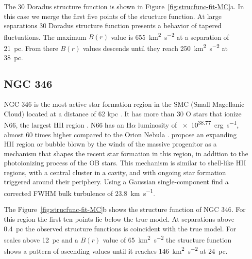 \documentclass[fleqn,usenatbib, useAMS, a4paper]{mnras}
\newcommand\pos{\ensuremath{_{\mathrm{pos}}}}
\newcommand\ha{\ensuremath{\text{H}\alpha}}
\begin{document}
The 30 Doradus structure function is shown in Figure~\ref{fig:strucfunc-fit-MC}a.
In this case we merge the first five points of the structure function.
At large separations 30 Doradus structure function presents a behavior of tapered fluctuations. The maximum \(B(r)\) value is \SI{655}{km^{2}.s^{-2}} at a separation of \SI{21}{pc}. 
From there \(B(r)\) values descends until they reach \SI{250}{km^{2}.s^{-2}} at \SI{38}{pc}.

\subsection{NGC 346}
\label{sec:ngc-346}

NGC 346 is the most active star-formation region in the SMC (Small Magellanic Cloud) located at a distance of 62 kpc \citetext{\SI{1}{\arcsecond} = \SI{0.30}{pc} ; \citealp{2001ApJ...562..303D}}. 
It has more than 30 O stars that ionize N66, the largest HII region \citep{2011ApJ...740...10D}.
N66 has an \ha{} luminosity of \SI{e38.77}{erg.s^{-1}}, almost 60 times higher compared to the Orion Nebula \citep{2010A&A...517A..39H,1984ApJ...287..116K}.
\citet{2008ApJ...688.1050G} propose an expanding HII region or bubble blown by the winds of the massive progenitor as a mechanism that shapes the recent star formation in this region, in addition to the photoionizing process of the OB stars. 
This mechanism is similar to shell-like HII regions, with a central cluster in a cavity, and with ongoing star formation triggered around their periphery.
Using a Gaussian single-component \citet{2003ApJ...586.1179D} find a corrected FWHM bulk turbulence of \SI{23.8}{km.s^{-1}}. 


The Figure~\ref{fig:strucfunc-fit-MC}b shows the structure function of NGC 346.
For this region the first ten points lie below the true model.
At separations above \SI{0.4}{pc} the observed structure functions is coincident with the true model. 
For scales above \SI{12}{pc} and a \(B(r)\) value of \SI{65}{km^{2}.s^{-2}} the structure function shows a pattern of ascending values until it reaches \SI{146}{km^{2}.s^{-2}} at \SI{24}{pc}.
\end{document}

